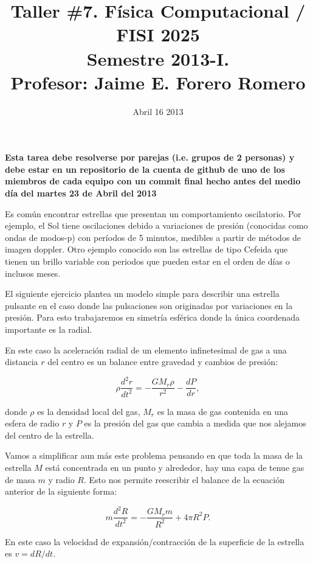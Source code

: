\documentclass{article}
\title{Taller \#7. F\'isica Computacional / FISI 2025 \\Semestre
  2013-I. \\ Profesor: Jaime E. Forero Romero}
\date{Abril 16 2013}
\begin{document}
\maketitle

{\bf Esta tarea debe resolverse por parejas (i.e. grupos de 2
  personas) y debe estar en un repositorio de la cuenta de github de
  uno de los miembros de cada equipo con un commit final hecho antes del
  medio d\'ia del martes 23 de Abril del 2013}  

Es com\'un encontrar estrellas que presentan un comportamiento
oscilatorio. Por ejemplo, el Sol tiene oscilaciones debido a
variaciones de presi\'on (conocidas como ondas de modos-p) con per\'iodos de 5
minutos, medibles a partir de m\'etodos de imagen doppler.  Otro
ejemplo conocido son las estrellas de tipo Cefeida que tienen un
brillo variable con  periodos que pueden estar en el orden de d\'ias o
inclusos meses.

El siguiente ejercicio plantea un modelo simple para describir una
estrella pulsante en el caso donde las pulsaciones son originadas por
variaciones en la presi\'on. Para esto trabajaremos en simetr\'ia
esf\'erica donde la \'unica coordenada importante es la radial.

En este caso la aceleraci\'on radial de un elemento infinetesimal de
gas a una distancia $r$ del centro es un balance entre gravedad y
cambios de presi\'on:

\begin{equation}
\rho\frac{d^2r}{d t^2} = -\frac{GM_r\rho}{r^2} - \frac{dP}{dr}, 
\end{equation}

donde $\rho$ es la densidad local del gas, $M_{r}$ es la masa de gas
contenida en una esfera de radio $r$ y $P$ es la presi\'on del gas que
cambia a medida que nos alejamos del centro de la estrella.

Vamos a simplificar aun m\'as este problema pensando en que toda la
masa de la estrella $M$ est\'a concentrada en un punto y alrededor,
hay una capa de tenue gas de masa $m$ y radio $R$. Esto nos permite
reescribir el balance de la ecuaci\'on anterior de la siguiente forma: 

\begin{equation}
m\frac{d^2R}{d t^2} = -\frac{GM_rm}{R^2} + 4\pi R^{2}P.
\end{equation}

En este caso la velocidad de expansi\'on/contracci\'on de la
superficie de la estrella es $v = dR/dt$. 
\end{document}
